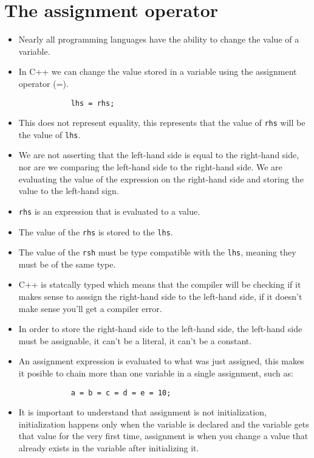 \section{The assignment operator}
\begin{itemize}
    \item Nearly all programming languages have the ability to change the value of a variable.
    \item In C++ we can change the value stored in a variable using the assignment operator (=).
        \begin{verbatim}
            lhs = rhs;
        \end{verbatim}
    \item This does not represent equality, this represents that the value of \verb|rhs| will be the value of \verb|lhs|.
    \item We are not asserting that the left-hand side is equal to the right-hand side, nor are we comparing the left-hand side to the right-hand side. We are evaluating the value of the expression on the right-hand side and storing the value to the left-hand sign.
    \item \verb|rhs| is an expression that is evaluated to a value.
    \item The value of the \verb|rhs| is stored to the \verb|lhs|.
    \item The value of the \verb|rsh| must be type compatible with the \verb|lhs|, meaning they must be of the same type.
    \item C++ is statcally typed which means that the compiler will be checking if it makes sense to asssign the right-hand side to the left-hand side, if it doesn't make sense you'll get a compiler error.
    \item In order to store the right-hand side to the left-hand side, the left-hand side must be assignable, it can't be a literal, it can't be a constant.
    \item An assignment expression is evaluated to what was just assigned, this makes it posible to chain more than one variable in a single assignment, such as: 
        \begin{verbatim}
            a = b = c = d = e = 10;
        \end{verbatim}
    
    \item It is important to understand that assignment is not initialization, initialization happens only when the variable is declared and the variable gets that value for the very first time, assignment is when you change a value that already exists in the variable after initializing it.
\end{itemize}

